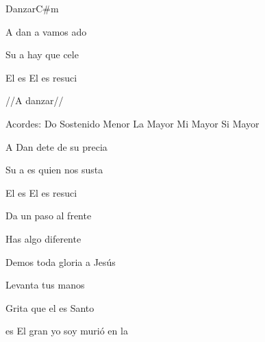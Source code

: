 \documentclass[12pt, spanish]{book}
\begin{document}
\begin{song}{Danzar}{C\#m}
\begin{SBOpGroup}
            A dan a  vamos ado

            Su a hay que cele

            El es  El es  resuci

            //A danzar//
        \end{SBOpGroup}

        \ifChordBk
        \begin{SBOpGroup}
            Acordes:
            \upchord{\Csm}\qquad Do Sostenido Menor \hfill
            \upchord{\A}\qquad La Mayor \hfill\null\break
            \upchord{\E}\qquad Mi Mayor \hfill
            \upchord{\B}\qquad Si Mayor \hfill\null\break
        \end{SBOpGroup}
        \fi

        \begin{SBExtraKeys}{

%
%
%
%

            \begin{SBChorus}
                A Dan dete de su precia

                Su a es quien nos susta

                El es  El es  resuci
            \end{SBChorus}


            \begin{SBOpGroup}
                Da un paso al frente

                Has algo diferente

                Demos toda gloria a Jesús


                Levanta tus manos

                Grita que el es Santo

                es El gran yo soy murió en la 
            \end{SBOpGroup}

}
\end{SBExtraKeys}
\end{song}
\end{document}

